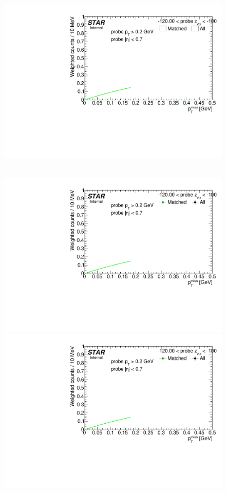 \begin{figure}[h!]
{  \includegraphics[width=\linewidth,page=9]{graphics/correctionsToEff/TOF_tagAndProbe/Fitting_effVsZVtx_mc.CPT2.pdf}
}~~~~
\parbox{0.24\textwidth}{
  \centering
  \includegraphics[width=\linewidth,page=4]{graphics/correctionsToEff/TOF_tagAndProbe/Fitting_effVsZVtx_data.CPT2.pdf}\\
  \includegraphics[width=\linewidth,page=6]{graphics/correctionsToEff/TOF_tagAndProbe/Fitting_effVsZVtx_data.CPT2.pdf}\\
}
\end{figure}
